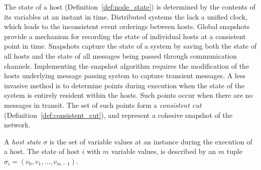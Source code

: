 The state of a host (Definition~\ref{def:node_state}) is determined by
the contents of its variables at an instant in time. Distributed
systems the lack a unified clock, which leads to the inconsistent event
orderings between hosts. Global snapshots ~\cite{lamport78} provide
a mechanism for recording the state of individual hosts at a consistent point in time.  Snapshots capture
the state of a system by saving both the state of all hosts and the
state of all messages being passed through communication channels.
Implementing the snapshot algorithm requires the modification of the
hosts underlying message passing system to capture transient
messages. A less invasive method is to determine points during execution
when the state of the system is entirely resident within the hosts.
Such points occur when there are no messages in transit.
The set of such points form a \textit{consistent cut}
(Definition~\ref{def:consistent_cut}), and represent a cohesive
snapshot of the network.

%
%
%
%
%



\begin{definition} \label{def:node_state} A \textit{host
    state} $\sigma$ is the set of variable values at an instance
    during the execution of a host.  The state of host $i$ with $m$
    variable values, is described by an $m$ tuple $\sigma_i =
    (v_0,v_1,\dots,v_{m-1})$.
\end{definition}
  

